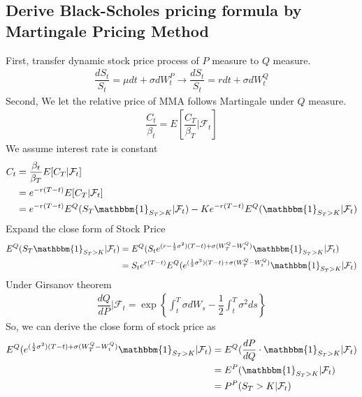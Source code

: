 \documentclass[12pt]{article}
\newcommand{\ind}{\mathbbm{1}}
\begin{document}
\subsection*{Derive Black-Scholes pricing formula by Martingale Pricing Method}
First, transfer dynamic stock price process of $P$ measure to $Q$ measure.\\
\begin{align*}
    \dfrac{dS_t}{S_t} = \mu dt + \sigma dW_t^P \to \dfrac{dS_t}{S_t} = r dt + \sigma dW_t^Q
\end{align*}
Second, We let the relative price of MMA follows Martingale under $Q$ measure.\\
\begin{align*}
    \dfrac{C_t}{\beta_t} = E\left[\dfrac{C_T}{\beta_T}|\mathcal{F}_t\right]
\end{align*}
We assume interest rate is constant
\begin{align*}
    C_t & = \dfrac{\beta_t}{\beta_T}E[C_T|\mathcal{F}_t]\\
    & = e^{-r(T-t)}E[C_T|\mathcal{F}_t]\\
    & = e^{-r(T-t)}E^Q(S_T\ind_{S_T>K}|\mathcal{F}_t) - Ke^{-r(T-t)}E^Q(\ind_{S_T>K}|\mathcal{F}_t)
\end{align*}
Expand the close form of Stock Price
\begin{align*}
    E^Q(S_T\ind_{S_T>K}|\mathcal{F}_t) & = E^Q(S_te^{(r - \frac{1}{2}\sigma^2)(T-t) + \sigma(W_T^Q - W_t^Q)}\ind_{S_T>K}|\mathcal{F}_t)\\
    & = S_te^{r(T-t)}E^Q(e^{(\frac{1}{2}\sigma^2)(T-t) + \sigma(W_T^Q - W_t^Q)}\ind_{S_T>K}|\mathcal{F}_t)\\
\end{align*}
Under Girsanov theorem
\begin{align*}
    \dfrac{dQ}{dP}|\mathcal{F}_t = \exp\left\{\int_t^T \sigma dW_s - \dfrac{1}{2}\int_t^T \sigma^2 ds\right\}
\end{align*}
So, we can derive the close form of stock price as
\begin{align*}
    E^Q(e^{(\frac{1}{2}\sigma^2)(T-t) + \sigma(W_T^Q - W_t^Q)}\ind_{S_T>K}|\mathcal{F}_t) & = E^Q(\dfrac{dP}{dQ}\cdot\ind_{S_T>K}|\mathcal{F}_t)\\
    & = E^P(\ind_{S_T>K}|\mathcal{F}_t)\\
    & = P^P(S_T>K|\mathcal{F}_t)\\
\end{align*}
\end{document}
